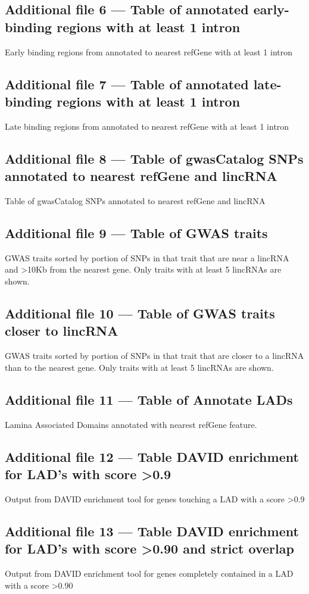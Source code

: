 \documentclass[10pt]{bmc_article}
\newenvironment{bmcformat}{\baselineskip20pt\sloppy\setboolean{publ}{false}}{\baselineskip20pt\sloppy}
\begin{document}
\begin{bmcformat}
  \subsection*{Additional file 6 --- Table of annotated early-binding regions with at least 1 intron}
  Early binding regions from \cite{Hansen} annotated to nearest refGene with at least 1 intron

  \subsection*{Additional file 7 --- Table of annotated late-binding regions with at least 1 intron}
  Late binding regions from \cite{Hansen} annotated to nearest refGene with at least 1 intron

  \subsection*{Additional file 8 --- Table of gwasCatalog SNPs annotated to nearest refGene and lincRNA}
  Table of gwasCatalog SNPs annotated to nearest refGene and lincRNA

  \subsection*{Additional file 9 --- Table of GWAS traits}
  GWAS traits sorted by portion of SNPs in that trait that are near a lincRNA and \textgreater 10Kb from the nearest
  gene. Only traits with at least 5 lincRNAs are shown.

  \subsection*{Additional file 10 --- Table of GWAS traits closer to lincRNA}
  GWAS traits sorted by portion of SNPs in that trait that are closer to a lincRNA than to the nearest
  gene. Only traits with at least 5 lincRNAs are shown.

  \subsection*{Additional file 11 --- Table of Annotate LADs}
  Lamina Associated Domains annotated with nearest refGene feature.

  \subsection*{Additional file 12 --- Table DAVID enrichment for LAD's with score \textgreater 0.9}
  Output from DAVID enrichment tool for genes touching a LAD with a score \textgreater 0.9

  \subsection*{Additional file 13 --- Table DAVID enrichment for LAD's with score \textgreater 0.90 and strict overlap}
  Output from DAVID enrichment tool for genes completely contained in a LAD with a score \textgreater 0.90

\end{bmcformat}
\end{document}
